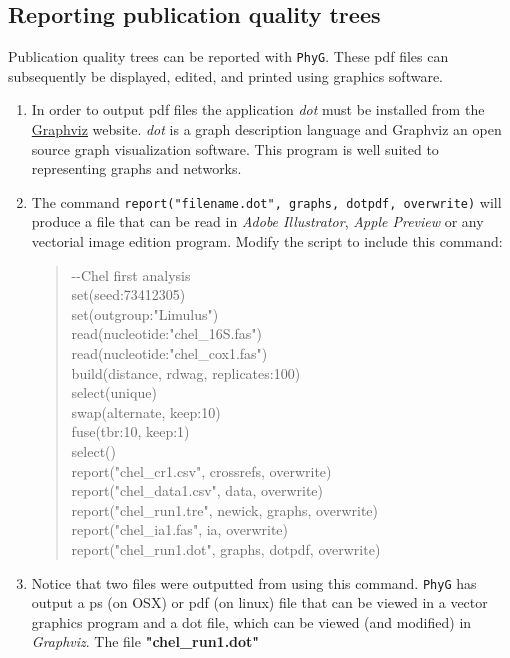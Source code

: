 \documentclass[11pt]{article}
\newcommand{\phyg}{\texttt{PhyG} }
\begin{document}
\subsection{Reporting publication quality trees}
\label{subsec:dotpdf}

Publication quality trees can be reported with \texttt{PhyG}. These pdf files can  
subsequently be displayed, edited, and printed using graphics software.

\begin{enumerate}

\item In order to output pdf files the application \emph{dot} must be installed from 
the \href{https://graphviz.org/download/}{Graphviz} website. \emph{dot} is a graph 
description language and Graphviz an  open source graph visualization software. 
This program is well suited to representing graphs and networks.

\item  The command \texttt{report("filename.dot", graphs, dotpdf, overwrite)} will 
produce a file that can be read in \emph{Adobe Illustrator}, \emph{Apple Preview} 
or any vectorial image edition program. Modify the script to include this command:

	\begin{quote}
	-\/-Chel first analysis\\
	set(seed:73412305)\\
	set(outgroup:"Limulus")\\
	read(nucleotide:"chel\_16S.fas")\\
	read(nucleotide:"chel\_cox1.fas")\\
	build(distance, rdwag, replicates:100)\\
	select(unique)\\
	swap(alternate, keep:10)\\
	fuse(tbr:10, keep:1)\\
	select()\\
	report("chel\_cr1.csv", crossrefs, overwrite)\\
	report("chel\_data1.csv", data, overwrite)\\
	report("chel\_run1.tre", newick, graphs, overwrite)\\
	report("chel\_ia1.fas", ia, overwrite)\\
	report("chel\_run1.dot", graphs, dotpdf, overwrite)\\
	\end{quote}
	
\item Notice that two files were outputted from using this command. \phyg has 
output a ps (on OSX) or pdf (on linux) file that can be viewed in a vector graphics program and a dot 
file, which can be viewed (and modified) in \emph{Graphviz}.
The file \textbf{"chel\_run1.dot"} 
\end{enumerate}
\end{document}

